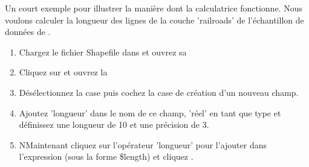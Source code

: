 Un court exemple pour illustrer la manière dont la calculatrice fonctionne. Nous voulons calculer la longueur des lignes de la couche 'railroads' de l'échantillon de données de \qg.

\begin{enumerate}
\item Chargez le fichier Shapefile  dans \qg et ouvrez sa 
\item Cliquez sur et ouvrez la 
\item Désélectionnez la case  puis cochez la case de création d'un nouveau champ.
\item Ajoutez 'longueur' dans le nom de ce champ, 'réel' en tant que type et définissez une longueur de 10 et une précision de 3.
\item NMaintenant cliquez sur l'opérateur 'longueur' pour l'ajouter dans l'expression (sous la forme \$length) et cliquez .
\end{enumerate}

\FloatBarrier
